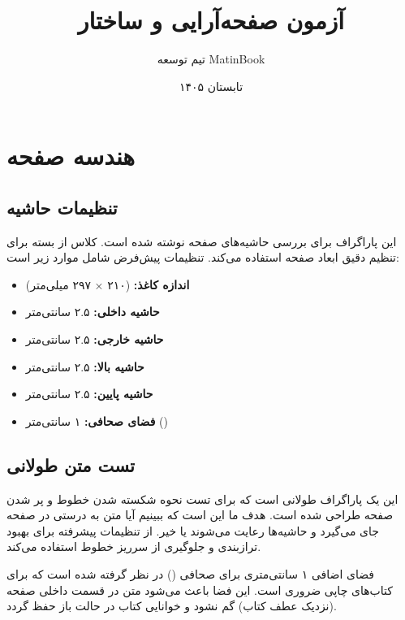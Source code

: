 \documentclass{matinbook}
\title{آزمون صفحه‌آرایی و ساختار}
\author{تیم توسعه MatinBook}
\date{تابستان ۱۴۰۵}
\begin{document}
\maketitle

\tableofcontents
\clearpage

\chapter{هندسه صفحه}

\section{تنظیمات حاشیه}

این پاراگراف برای بررسی حاشیه‌های صفحه نوشته شده است.
کلاس  از بسته  برای تنظیم دقیق
ابعاد صفحه استفاده می‌کند. تنظیمات پیش‌فرض شامل موارد زیر است:

\begin{itemize}
    \item \textbf{اندازه کاغذ:}  (۲۱۰ × ۲۹۷ میلی‌متر)
    \item \textbf{حاشیه داخلی:} ۲.۵ سانتی‌متر
    \item \textbf{حاشیه خارجی:} ۲.۵ سانتی‌متر
    \item \textbf{حاشیه بالا:} ۲.۵ سانتی‌متر
    \item \textbf{حاشیه پایین:} ۲.۵ سانتی‌متر
    \item \textbf{فضای صحافی:} ۱ سانتی‌متر ()
\end{itemize}

\section{تست متن طولانی}

این یک پاراگراف طولانی است که برای تست نحوه شکسته شدن خطوط
و پر شدن صفحه طراحی شده است. هدف ما این است که ببینیم آیا
متن به درستی در صفحه جای می‌گیرد و حاشیه‌ها رعایت می‌شوند
یا خیر.  از تنظیمات پیشرفته 
برای بهبود ترازبندی و جلوگیری از سرریز خطوط استفاده می‌کند.

فضای اضافی ۱ سانتی‌متری برای صحافی ()
در نظر گرفته شده است که برای کتاب‌های چاپی ضروری است.
این فضا باعث می‌شود متن در قسمت داخلی صفحه (نزدیک عطف کتاب)
گم نشود و خوانایی کتاب در حالت باز حفظ گردد.
\end{document}
